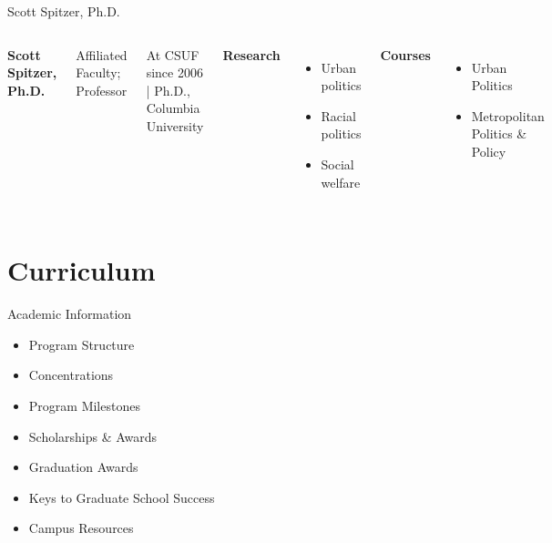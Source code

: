 \documentclass[10pt]{beamer}
\newlength{\imageheight}
\begin{document}
\begin{frame}{Scott Spitzer, Ph.D.}
\begin{columns}[T,onlytextwidth]
    \raggedright
    {\large\bfseries Scott Spitzer, Ph.D.}\par
    {Affiliated Faculty; Professor}\par
    {\footnotesize At CSUF since 2006 \quad | \quad Ph.D., Columbia University}\par\vspace{0.4em}

    \textbf{Research}
    \begin{itemize}
      \item Urban politics
      \item Racial politics
      \item Social welfare
    \end{itemize}

    \textbf{Courses}
    \begin{itemize}
      \item Urban Politics
      \item Metropolitan Politics \& Policy
    \end{itemize}

    \vspace*{0.25cm}
    \includegraphics[height=\imageheight]{images/spitzer.png}
\end{columns}
\end{frame}

\section{Curriculum}
\begin{frame}{Academic Information}
\begin{itemize}
  \item Program Structure
  \item Concentrations
  \item Program Milestones
  \item Scholarships \& Awards
  \item Graduation Awards
  \item Keys to Graduate School Success
  \item Campus Resources
\end{itemize}
\end{frame}
\end{document}
